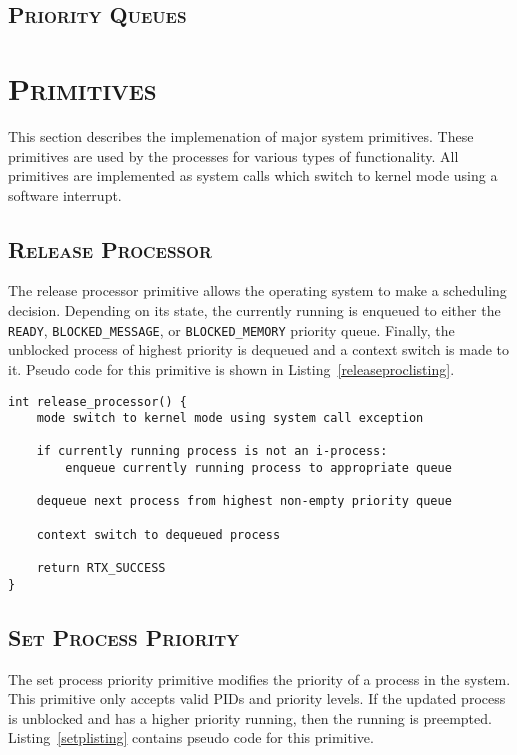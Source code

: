 \documentclass[oneside]{report}
\begin{document}
\subsection{\textsc{Priority Queues}}

\section{\textsc{Primitives}}
This section describes the implemenation of major system primitives. These 
primitives are used by the processes for various types of functionality. All 
primitives are implemented as system calls which switch to kernel mode using a 
software interrupt.

\subsection{\textsc{Release Processor}}
The release processor primitive allows the operating system to make a
scheduling decision. Depending on its state, the currently running is
enqueued to either the \texttt{READY}, \texttt{BLOCKED\_MESSAGE}, or
\texttt{BLOCKED\_MEMORY} priority queue. Finally, the unblocked process
of highest priority is dequeued and a context switch is made to it. Pseudo code 
for this primitive is shown in Listing~\ref{releaseproclisting}.

\begin{lstlisting}
int release_processor() {
    mode switch to kernel mode using system call exception

    if currently running process is not an i-process:
        enqueue currently running process to appropriate queue

    dequeue next process from highest non-empty priority queue

    context switch to dequeued process
    
    return RTX_SUCCESS
}
\end{lstlisting}

\subsection{\textsc{Set Process Priority}}

The set process priority primitive modifies the priority of a process
in the system. This primitive only accepts valid PIDs and priority
levels. If the updated process is unblocked and has a higher priority
running, then the running is preempted. Listing~\ref{setplisting}
contains pseudo code for this primitive.
\end{document}
